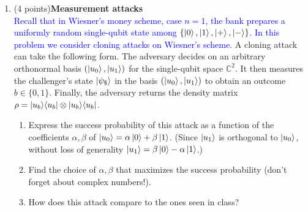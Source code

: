 \documentclass[12pt]{article}
\begin{document}
\begin{enumerate}
\item (4 points){\bf Measurement attacks}\\
\textcolor{blue}{Recall that in Wiesner's money scheme, case $n=1$, the bank prepares a uniformly random single-qubit state among $\{\ket{0},\ket{1},\ket{+},\ket{-}\}$. In this problem we consider cloning attacks on Wiesner's scheme.} A cloning attack can take the following form. The adversary decides on an arbitrary orthonormal basis $(\ket{u_0},\ket{u_1})$ for the single-qubit space $\mathbb{C}^2$. It then measures the challenger's state $\ket{\psi_\$}$ in the basis $(\ket{u_0},\ket{u_1})$ to obtain an outcome $b\in\{0,1\}$. Finally, the adversary returns the density matrix $\rho = \ket{u_b}\!\bra{u_b}\otimes \ket{u_b}\!\bra{u_b}$. 
\begin{enumerate}
\item Express the success probability of this attack as a function of the coefficients $\alpha,\beta$ of $\ket{u_0} = \alpha \ket{0} + \beta\ket{1}$. (Since $\ket{u_1}$ is orthogonal to $\ket{u_0}$, without loss of generality $\ket{u_1} = \beta\ket{0} - \alpha \ket{1}$.) 
\item Find the choice of $\alpha,\beta$ that maximizes the success probability (don't forget about complex numbers!). 
\item How does this attack compare to the ones seen in class?
\end{enumerate}




\end{enumerate}
\end{document}
